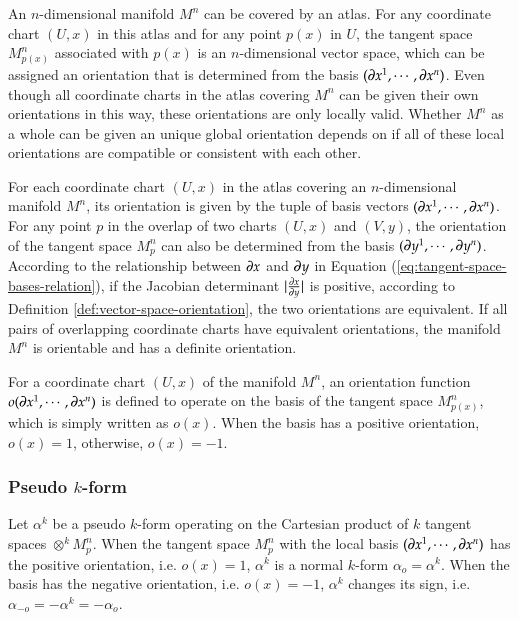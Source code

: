 \documentclass[11pt, a4paper]{book}
\begin{document}
An $n$-dimensional manifold $M^n$ can be covered by an atlas. For any coordinate chart
$(U,x)$ in this atlas and for any point $p(x)$ in $U$, the tangent space $M_{p(x)}^n$
associated with $p(x)$ is an $n$-dimensional vector space, which can be assigned an
orientation that is determined from the basis
$(\boldsymbol{\partial}x^1,\cdots,\boldsymbol{\partial}x^n)$. Even though all coordinate charts in the
atlas covering $M^n$ can be given their own orientations in this way, these orientations
are only locally valid. Whether $M^n$ as a whole can be given an unique global orientation
depends on if all of these local orientations are compatible or consistent with each
other.

\begin{Definition}
  \label{def:manifold-orientation}
  For each coordinate chart $(U,x)$ in the atlas covering an $n$-dimensional manifold
  $M^n$, its orientation is given by the tuple of basis vectors
  $(\boldsymbol{\partial}x^1,\cdots,\boldsymbol{\partial}x^n)$. For any point $p$ in the overlap of two
  charts $(U,x)$ and $(V,y)$, the orientation of the tangent space $M_p^n$ can also be
  determined from the basis $(\boldsymbol{\partial}y^1,\cdots,\boldsymbol{\partial}y^n)$. According to the
  relationship between $\boldsymbol{\partial}x$ and $\boldsymbol{\partial}y$ in Equation
  (\ref{eq:tangent-space-bases-relation}), if the Jacobian determinant
  $\lvert\frac{\partial x}{\partial y}\rvert$ is positive, according to Definition
  \ref{def:vector-space-orientation}, the two orientations are equivalent. If all pairs of
  overlapping coordinate charts have equivalent orientations, the manifold $M^n$ is
  orientable and has a definite orientation.
\end{Definition}

\begin{Definition}
  For a coordinate chart $(U,x)$ of the manifold $M^n$, an orientation function
  $o(\boldsymbol{\partial}x^1,\cdots,\boldsymbol{\partial}x^n)$ is defined to operate on the basis of the
  tangent space $M_{p(x)}^n$, which is simply written as $o(x)$. When the basis has a
  positive orientation, $o(x) = 1$, otherwise, $o(x) = -1$.
\end{Definition}

\subsubsection{Pseudo $k$-form}

\begin{Definition}
  \label{def:pseudo-form}
  Let $\alpha^k$ be a pseudo $k$-form operating on the Cartesian product of $k$ tangent
  spaces $\otimes^k M_p^n$. When the tangent space $M_p^n$ with the local basis
  $(\boldsymbol{\partial}x^1,\cdots,\boldsymbol{\partial}x^n)$ has the positive orientation, i.e.
  $o(x) = 1$, $\alpha^k$ is a normal $k$-form $\alpha_o = \alpha^k$. When the basis has
  the negative orientation, i.e. $o(x) = -1$, $\alpha^k$ changes its sign, i.e.
  $\alpha_{-o} = -\alpha^k = -\alpha_o$.
\end{Definition}
\end{document}

